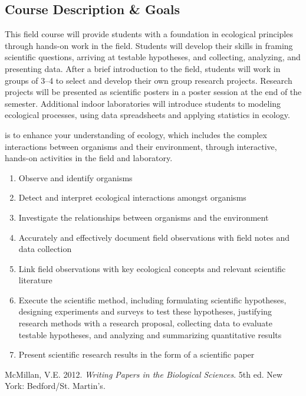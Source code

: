 \documentclass{tufte-handout}
\begin{document}
\begin{fullwidth}

\section{Course Description \& Goals}

This field course will provide students with a foundation in ecological principles through hands-on work in the field. Students will develop their skills in framing scientific questions, arriving at testable hypotheses, and collecting, analyzing, and presenting data. After a brief introduction to the field, students will work in groups of 3--4 to select and develop their own group research projects. Research projects will be presented as scientific posters in a poster session at the end of the semester. Additional indoor laboratories will introduce students to modeling ecological processes, using data spreadsheets and applying statistics in ecology.

 is to enhance your understanding of ecology, which includes the complex interactions between organisms and their environment, through interactive, hands-on activities in the field and laboratory. 


\begin{enumerate}
	\item Observe and identify organisms
	\item Detect and interpret ecological interactions amongst organisms
	\item Investigate the relationships between organisms and the environment
	\item Accurately and effectively document field observations with field notes and data collection
	\item Link field observations with key ecological concepts and relevant scientific literature
	\item Execute the scientific method, including formulating scientific hypotheses, designing experiments and surveys to test these hypotheses, justifying research methods with a research proposal, collecting data to evaluate testable hypotheses, and analyzing and summarizing quantitative results
	\item Present scientific research results in the form of a scientific paper
\end{enumerate}

 McMillan, V.E. 2012. \emph{Writing Papers in the Biological Sciences}. 5th ed. New York: Bedford/St. Martin's.


\end{fullwidth}
\end{document}
